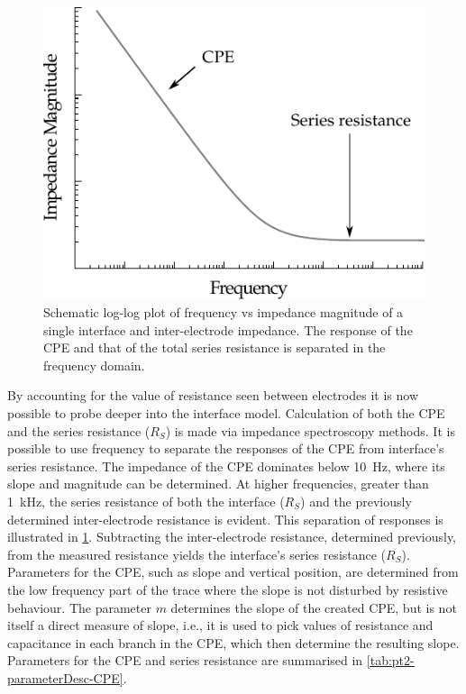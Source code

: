     \begin{figure}[ht]
      \centering
      \includegraphics{content/pt2/07-InterfaceModel/graphics/graph_cpePlotGeneral}
      \caption{\label{fig:pt2-graph_cpePlotGeneral}Schematic log-log plot of frequency vs impedance magnitude of a single interface and inter-electrode impedance. The response of the CPE and that of the total series resistance is separated in the frequency domain.}
    \end{figure}
    By accounting for the value of resistance seen between electrodes it is now possible to probe deeper into the interface model.
    Calculation of both the CPE and the series resistance ($R_S$) is made via impedance spectroscopy methods.
    It is possible to use frequency to separate the responses of the CPE from interface's series resistance.
    The impedance of the CPE dominates below \SI{10}{\hertz}, where its slope and magnitude can be determined.
    At higher frequencies, greater than \SI{1}{\kilo\hertz}, the series resistance of both the interface ($R_S$) and the previously determined inter-electrode resistance is evident.
    This separation of responses is illustrated in \cref{fig:pt2-graph_cpePlotGeneral}.
    Subtracting the inter-electrode resistance, determined previously, from the measured resistance yields the interface's series resistance ($R_S$).
    Parameters for the CPE, such as slope and vertical position, are determined from the low frequency part of the trace where the slope is not disturbed by resistive behaviour.
    The parameter $m$ determines the slope of the created CPE, but is not itself a direct measure of slope, i.e., it is used to pick values of resistance and capacitance in each branch in the CPE, which then determine the resulting slope.
    Parameters for the CPE and series resistance are summarised in \cref{tab:pt2-parameterDesc-CPE}.

